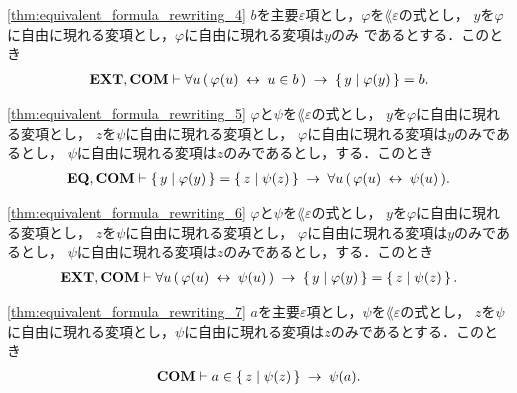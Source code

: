 	\begin{screen}
		\begin{thm}
		\ref{thm:equivalent_formula_rewriting_4}
			$b$を主要$\varepsilon$項とし，$\varphi$を$\lang{\varepsilon}$の式とし，
			$y$を$\varphi$に自由に現れる変項とし，$\varphi$に自由に現れる変項は$y$のみ
			であるとする．このとき
			\begin{align}
				\mbox{{\bf EXT}},\mbox{\bf COM} \vdash \forall u\, (\, \varphi(u) \hspace{0.25em}\leftrightarrow\hspace{0.25em} u \in b\, )
				\hspace{0.25em}\rightarrow\hspace{0.25em} \left\{\, y \mid \varphi(y)\, \right\} = b.
			\end{align}
		\end{thm}
	\end{screen}
	
	\begin{screen}
		\begin{thm}
		\ref{thm:equivalent_formula_rewriting_5}
			$\varphi$と$\psi$を$\lang{\varepsilon}$の式とし，
			$y$を$\varphi$に自由に現れる変項とし，
			$z$を$\psi$に自由に現れる変項とし，
			$\varphi$に自由に現れる変項は$y$のみであるとし，
			$\psi$に自由に現れる変項は$z$のみであるとし，する．このとき
			\begin{align}
				\mbox{{\bf EQ}},\mbox{\bf COM} \vdash \left\{\, y \mid \varphi(y)\, \right\} = \left\{\, z \mid \psi(z)\, \right\}
				\hspace{0.25em}\rightarrow\hspace{0.25em} \forall u\, (\, \varphi(u) \hspace{0.25em}\leftrightarrow\hspace{0.25em} \psi(u)\, ).
			\end{align}
		\end{thm}
	\end{screen}
	
	\begin{screen}
		\begin{thm}
		\ref{thm:equivalent_formula_rewriting_6}
			$\varphi$と$\psi$を$\lang{\varepsilon}$の式とし，
			$y$を$\varphi$に自由に現れる変項とし，
			$z$を$\psi$に自由に現れる変項とし，
			$\varphi$に自由に現れる変項は$y$のみであるとし，
			$\psi$に自由に現れる変項は$z$のみであるとし，する．このとき
			\begin{align}
				\mbox{{\bf EXT}},\mbox{\bf COM} \vdash \forall u\, (\, \varphi(u) \hspace{0.25em}\leftrightarrow\hspace{0.25em} \psi(u)\, )
				\hspace{0.25em}\rightarrow\hspace{0.25em} \left\{\, y \mid \varphi(y)\, \right\} = \left\{\, z \mid \psi(z)\, \right\}.
			\end{align}
		\end{thm}
	\end{screen}
	
	\begin{screen}
		\begin{thm}
		\ref{thm:equivalent_formula_rewriting_7}
			$a$を主要$\varepsilon$項とし，$\psi$を$\lang{\varepsilon}$の式とし，
			$z$を$\psi$に自由に現れる変項とし，$\psi$に自由に現れる変項は$z$のみであるとする．このとき
			\begin{align}
				\mbox{\bf COM} \vdash a \in \left\{\, z \mid \psi(z)\, \right\} \hspace{0.25em}\rightarrow\hspace{0.25em} \psi(a).
			\end{align}
		\end{thm}
	\end{screen}
	
